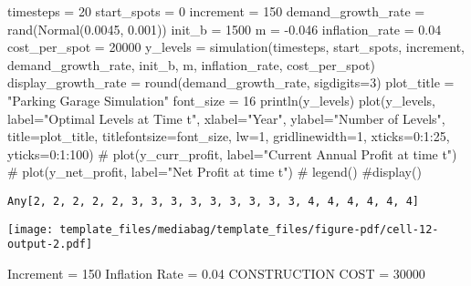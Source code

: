 \documentclass[
  letterpaper,
  DIV=11,
  numbers=noendperiod]{scrartcl}
\newenvironment{Shaded}{\begin{snugshade}}{\end{snugshade}}
\newcommand{\CommentTok}[1]{\textcolor[rgb]{0.37,0.37,0.37}{#1}}
\newcommand{\FloatTok}[1]{\textcolor[rgb]{0.68,0.00,0.00}{#1}}
\newcommand{\FunctionTok}[1]{\textcolor[rgb]{0.28,0.35,0.67}{#1}}
\newcommand{\NormalTok}[1]{\textcolor[rgb]{0.00,0.23,0.31}{#1}}
\newcommand{\OperatorTok}[1]{\textcolor[rgb]{0.37,0.37,0.37}{#1}}
\newcommand{\StringTok}[1]{\textcolor[rgb]{0.13,0.47,0.30}{#1}}
\begin{document}
\begin{Shaded}
\begin{Highlighting}[]
\NormalTok{timesteps }\OperatorTok{=} \FloatTok{20} 
\NormalTok{start\_spots }\OperatorTok{=} \FloatTok{0}
\NormalTok{increment }\OperatorTok{=} \FloatTok{150}
\NormalTok{demand\_growth\_rate }\OperatorTok{=} \FunctionTok{rand}\NormalTok{(}\FunctionTok{Normal}\NormalTok{(}\FloatTok{0.0045}\NormalTok{, }\FloatTok{0.001}\NormalTok{))}
\NormalTok{init\_b }\OperatorTok{=} \FloatTok{1500}
\NormalTok{m }\OperatorTok{=} \OperatorTok{{-}}\FloatTok{0.046}
\NormalTok{inflation\_rate }\OperatorTok{=} \FloatTok{0.04}
\NormalTok{cost\_per\_spot }\OperatorTok{=} \FloatTok{20000}
\NormalTok{y\_levels }\OperatorTok{=} \FunctionTok{simulation}\NormalTok{(timesteps, start\_spots, increment, demand\_growth\_rate, init\_b, m, inflation\_rate, cost\_per\_spot)}
\NormalTok{display\_growth\_rate }\OperatorTok{=} \FunctionTok{round}\NormalTok{(demand\_growth\_rate, sigdigits}\OperatorTok{=}\FloatTok{3}\NormalTok{)}
\NormalTok{plot\_title }\OperatorTok{=} \StringTok{"Parking Garage Simulation"}
\NormalTok{font\_size }\OperatorTok{=} \FloatTok{16}
\FunctionTok{println}\NormalTok{(y\_levels)}
\FunctionTok{plot}\NormalTok{(y\_levels, label}\OperatorTok{=}\StringTok{"Optimal Levels at Time t"}\NormalTok{, xlabel}\OperatorTok{=}\StringTok{"Year"}\NormalTok{, ylabel}\OperatorTok{=}\StringTok{"Number of Levels"}\NormalTok{,}
\NormalTok{title}\OperatorTok{=}\NormalTok{plot\_title, titlefontsize}\OperatorTok{=}\NormalTok{font\_size, lw}\OperatorTok{=}\FloatTok{1}\NormalTok{, gridlinewidth}\OperatorTok{=}\FloatTok{1}\NormalTok{, xticks}\OperatorTok{=}\FloatTok{0}\OperatorTok{:}\FloatTok{1}\OperatorTok{:}\FloatTok{25}\NormalTok{, yticks}\OperatorTok{=}\FloatTok{0}\OperatorTok{:}\FloatTok{1}\OperatorTok{:}\FloatTok{100}\NormalTok{)}
\CommentTok{\# plot(y\_curr\_profit, label="Current Annual Profit at time t")}
\CommentTok{\# plot(y\_net\_profit, label="Net Profit at time t")}
\CommentTok{\# legend()}
\CommentTok{\#display()}
\end{Highlighting}
\end{Shaded}

\begin{verbatim}
Any[2, 2, 2, 2, 2, 3, 3, 3, 3, 3, 3, 3, 3, 3, 4, 4, 4, 4, 4, 4]
\end{verbatim}

\texttt{[image: template\_files/mediabag/template\_files/figure-pdf/cell-12-output-2.pdf]}

Increment = 150 Inflation Rate = 0.04 CONSTRUCTION COST = 30000
\end{document}
